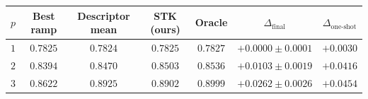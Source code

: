 \begin{tabular}{lcccccc}
\toprule
$p$ & Best ramp & Descriptor mean & STK (ours) & Oracle & $\Delta_{\mathrm{final}}$ & $\Delta_{\text{one-shot}}$ \\
\midrule
$1$ & $0.7825$ & $0.7824$ & $\mathbf{0.7825}$ & $0.7827$ & $+0.0000\pm0.0001$ & $+0.0030$ \\
$2$ & $0.8394$ & $0.8470$ & $\mathbf{0.8503}$ & $0.8536$ & $+0.0103\pm0.0019$ & $+0.0416$ \\
$3$ & $0.8622$ & $0.8925$ & $\mathbf{0.8902}$ & $0.8999$ & $+0.0262\pm0.0026$ & $+0.0454$ \\
\bottomrule
\end{tabular}
